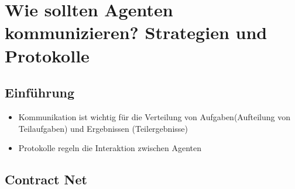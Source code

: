 \documentclass{article} %
\begin{document}
	\section{Wie sollten Agenten kommunizieren? Strategien und Protokolle}
	\subsection{Einführung}
	\begin{itemize}
		\item Kommunikation ist wichtig für die Verteilung von Aufgaben(Aufteilung von Teilaufgaben) und Ergebnissen (Teilergebnisse)
		\item Protokolle regeln die Interaktion zwischen Agenten
	\end{itemize}
	\subsection{Contract Net}
\end{document}
